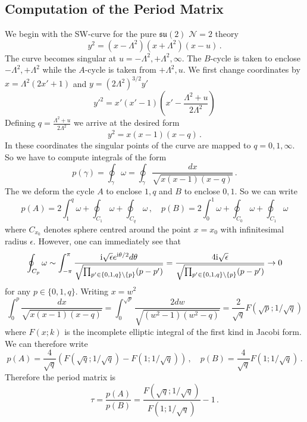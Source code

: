 \documentclass[main.tex]{subfiles}
\begin{document}
\subsection{Computation of the Period Matrix}
We begin with the SW-curve for the pure $\mathfrak{su}(2)$ $\mathcal{N}=2$ theory
\begin{equation}
y^2=(x-\Lambda^2)(x+\Lambda^2)(x-u)\,.
\end{equation} 
The curve becomes singular at $u=-\Lambda^2,+\Lambda^2,\infty$. The $B$-cycle is taken to enclose $-\Lambda^2,+\Lambda^2$ while the $A$-cycle is taken from $+\Lambda^2,u$.
We first change coordinates by $x= \Lambda^2(2x'+1)$ and $y=(2\Lambda^2)^{3/2}y'$
\begin{equation}
y'^2=x'(x'-1)\left(x'-\frac{\Lambda^2+u}{2\Lambda^2}\right)
\end{equation}
Defining $q=\frac{\Lambda^2+u}{2\Lambda^2}$ we arrive at the desired form
\begin{equation}
y^2=x(x-1)(x-q)\,.
\end{equation}
In these coordinates the singular points of the curve are mapped to $q=0,1,\infty$.
So we have to compute integrals of the form
\begin{equation}
p(\gamma)=\oint_{\gamma}\omega=\oint_{\gamma}\frac{dx}{\sqrt{x(x-1)(x-q)}}\,.
\end{equation}
The we deform the cycle $A$ to enclose $1,q$ and $B$ to enclose $0,1$. So we can write
\begin{equation}
p(A)=2\int_{1}^q\omega+\oint_{C_1}\omega+\oint_{C_q}\omega\,,\quad p(B)=2\int_{0}^1\omega+\oint_{C_0}\omega+\oint_{C_1}\omega
\end{equation}
where $C_{x_0}$ denotes sphere centred around the point $x=x_0$ with infinitesimal radius $\epsilon$. However, one can immediately see that
\begin{equation}
\oint_{C_p}\omega\sim\int_{-\pi}^{\pi}\frac{\mathrm{i}\sqrt{\epsilon} e^{\mathrm{i}\theta/2} d\theta}{\sqrt{\prod_{p'\in\{0,1,q\}\backslash\{p\}}(p-p')}}=\frac{4\mathrm{i}\sqrt{\epsilon} }{\sqrt{\prod_{p'\in\{0,1,q\}\backslash\{p\}}(p-p')}}\to0
\end{equation}
for any $p\in\{0,1,q\}$. Writing $x=w^2$
\begin{equation}
\int_{0}^p\frac{dx}{\sqrt{x(x-1)(x-q)}}=\int_{0}^{\sqrt{p}}\frac{2dw}{\sqrt{(w^2-1)(w^2-q)}}=\frac{2}{\sqrt{q}}F(\sqrt{p};1/\sqrt{q})
\end{equation}
where $F(x;k)$ is the incomplete elliptic integral of the first kind in Jacobi form.
We can therefore write
\begin{equation}
p(A)=\frac{4}{\sqrt{q}}\left(F(\sqrt{q};1/\sqrt{q})-F(1;1/\sqrt{q})\right)\,,\quad p(B)=\frac{4}{\sqrt{q}}F(1;1/\sqrt{q})\,.
\end{equation}
Therefore the period matrix is
\begin{equation}
\tau=\frac{p(A)}{p(B)}=\frac{F(\sqrt{q};1/\sqrt{q})}{F(1;1/\sqrt{q})}-1\,.
\end{equation}
\end{document}
